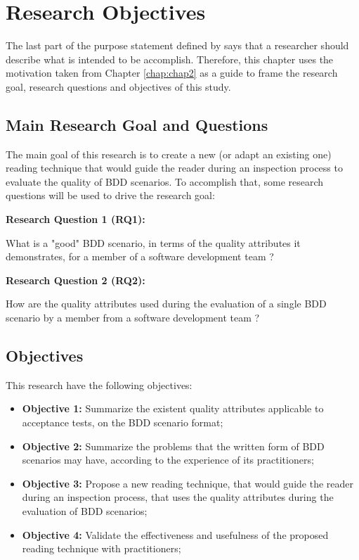 \chapter{\label{chap:chap3}{Research Objectives}}

The last part of the purpose statement defined by \cite{Creswell_2008} says that a researcher should describe what is intended to be accomplish. Therefore, this chapter uses the motivation taken from Chapter \ref{chap:chap2} as a guide to frame the research goal, research questions and objectives of this study. 

\section{Main Research Goal and Questions}

The main goal of this research is to create a new (or adapt an existing one) reading technique that would guide the reader during an inspection process to evaluate the quality of BDD scenarios. To accomplish that, some research questions will be used to drive the research goal:

\begin{framed}

\indent \textbf{Research Question 1 (RQ1):}

What is a "good" BDD scenario, in terms of the quality attributes it demonstrates, for a member of a software development team ?

\indent \textbf{Research Question 2 (RQ2):}


How are the quality attributes used during the evaluation of a single BDD scenario by a member from a software development team ?

\end{framed}

\section{Objectives}

This research have the following objectives:

\begin{itemize}
    \item \textbf{Objective 1:} Summarize the existent quality attributes applicable to acceptance tests, on the BDD scenario format;
    \item \textbf{Objective 2:} Summarize the problems that the written form of BDD scenarios may have, according to the experience of its practitioners;
    \item \textbf{Objective 3:} Propose a new reading technique, that would guide the reader during an inspection process, that uses the quality attributes during the evaluation of BDD scenarios;
    \item \textbf{Objective 4:} Validate the effectiveness and usefulness of the proposed reading technique with practitioners;
\end{itemize}